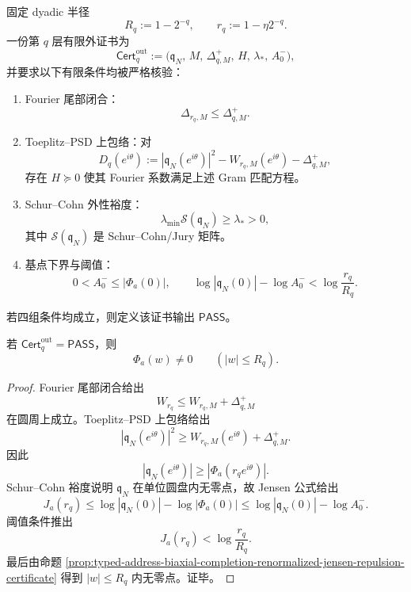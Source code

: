 \begin{definition}\label{def:typed-address-biaxial-completion-finite-fourier-toeplitz-outer-certificate}
固定 dyadic 半径
\[
R_q:=1-2^{-q},
\qquad
r_q:=1-\eta2^{-q}.
\]
一份第 \(q\) 层有限外证书为
\[
\mathsf{Cert}^{\mathrm{out}}_q
:=
\bigl(
\mathfrak q_N,\,
M,\,
\Delta^+_{q,M},\,
H,\,
\lambda_*,\,
A_0^-
\bigr),
\]
并要求以下有限条件均被严格核验：
\begin{enumerate}
  \item Fourier 尾部闭合：
  \[
  \Delta_{r_q,M}\le \Delta^+_{q,M}.
  \]
  \item Toeplitz--PSD 上包络：对
  \[
  D_q(e^{i\theta})
  :=
  |\mathfrak q_N(e^{i\theta})|^2
  -W_{r_q,M}(e^{i\theta})
  -\Delta^+_{q,M},
  \]
  存在 \(H\succeq0\) 使其 Fourier 系数满足上述 Gram 匹配方程。
  \item Schur--Cohn 外性裕度：
  \[
  \lambda_{\min}\mathcal S(\mathfrak q_N)\ge\lambda_*>0,
  \]
  其中 \(\mathcal S(\mathfrak q_N)\) 是 Schur--Cohn/Jury 矩阵。
  \item 基点下界与阈值：
  \[
  0<A_0^-\le|\Phi_a(0)|,
  \qquad
  \log|\mathfrak q_N(0)|-\log A_0^-
  <
  \log\frac{r_q}{R_q}.
  \]
\end{enumerate}
若四组条件均成立，则定义该证书输出 \(\mathsf{PASS}\)。
\end{definition}

\begin{theorem}\label{thm:typed-address-biaxial-completion-finite-fourier-toeplitz-outer-certificate-soundness}
若 \(\mathsf{Cert}^{\mathrm{out}}_q=\mathsf{PASS}\)，则
\[
\Phi_a(w)\ne0\qquad(|w|\le R_q).
\]
\end{theorem}
\begin{proof}
Fourier 尾部闭合给出
\[
W_{r_q}\le W_{r_q,M}+\Delta^+_{q,M}
\]
在圆周上成立。Toeplitz--PSD 上包络给出
\[
|\mathfrak q_N(e^{i\theta})|^2
\ge
W_{r_q,M}(e^{i\theta})+\Delta^+_{q,M}.
\]
因此
\[
|\mathfrak q_N(e^{i\theta})|
\ge
|\Phi_a(r_qe^{i\theta})|.
\]
Schur--Cohn 裕度说明 \(\mathfrak q_N\) 在单位圆盘内无零点，故 Jensen 公式给出
\[
J_a(r_q)
\le
\log|\mathfrak q_N(0)|-\log|\Phi_a(0)|
\le
\log|\mathfrak q_N(0)|-\log A_0^-.
\]
阈值条件推出
\[
J_a(r_q)<\log\frac{r_q}{R_q}.
\]
最后由命题 \ref{prop:typed-address-biaxial-completion-renormalized-jensen-repulsion-certificate} 得到 \(|w|\le R_q\) 内无零点。证毕。
\end{proof}

